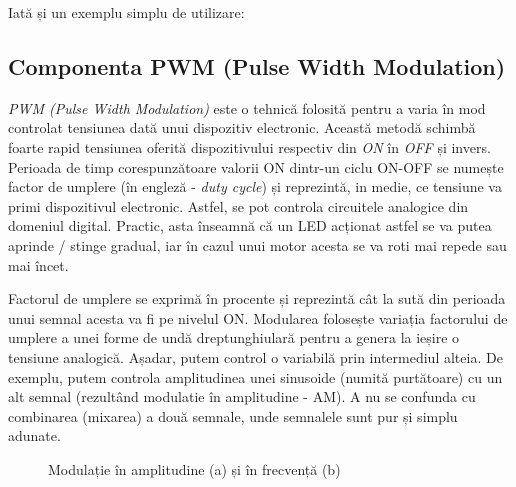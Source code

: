 Iată și un exemplu simplu de utilizare:



\subsection{Componenta PWM (Pulse Width Modulation)}

\textit{PWM (Pulse Width Modulation)} este o tehnică folosită pentru a varia în mod controlat tensiunea dată unui dispozitiv electronic. Această metodă schimbă foarte rapid tensiunea oferită dispozitivului respectiv din \textit{ON} în \textit{OFF} și invers. Perioada de timp corespunzătoare valorii ON dintr-un ciclu ON-OFF se numește factor de umplere (în engleză - \textit{duty cycle}) și reprezintă, in medie, ce tensiune va primi dispozitivul electronic. Astfel, se pot controla circuitele analogice din domeniul digital. Practic, asta înseamnă că un LED acționat astfel se va putea aprinde / stinge gradual, iar în cazul unui motor acesta se va roti mai repede sau mai încet.

Factorul de umplere se exprimă în procente și reprezintă cât la sută din perioada unui semnal acesta va fi pe nivelul ON. Modularea folosește variația factorului de umplere a unei forme de undă dreptunghiulară pentru a genera la ieșire o tensiune analogică. Așadar, putem control o variabilă prin intermediul alteia. De exemplu, putem controla amplitudinea unei sinusoide (numită purtătoare) cu un alt semnal (rezultând modulatie în amplitudine - AM). A nu se confunda cu combinarea (mixarea) a două semnale, unde semnalele sunt pur și simplu adunate.

\begin{figure}
    \centering
    \caption{Modulație în amplitudine (a) și în frecvență (b)} 
    \label{fig:CodeWarrior-Modulation} 
\end{figure} 

